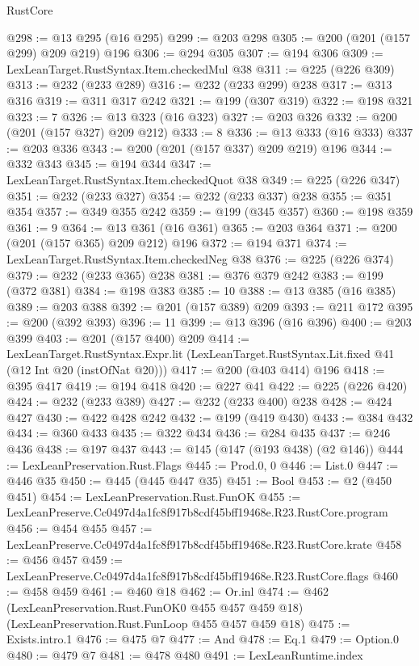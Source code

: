 \begin{lexlean}{RustCore}
\begin{coremodule}
@298 := @13 @295 (@16 @295)
@299 := @203 @298
@305 := @200 (@201 (@157 @299) @209 @219) @196
@306 := @294 @305
@307 := @194 @306
@309 := LexLeanTarget.RustSyntax.Item.checkedMul @38
@311 := @225 (@226 @309)
@313 := @232 (@233 @289)
@316 := @232 (@233 @299) @238
@317 := @313 @316
@319 := @311 @317 @242
@321 := @199 (@307 @319)
@322 := @198 @321
@323 := 7
@326 := @13 @323 (@16 @323)
@327 := @203 @326
@332 := @200 (@201 (@157 @327) @209 @212)
@333 := 8
@336 := @13 @333 (@16 @333)
@337 := @203 @336
@343 := @200 (@201 (@157 @337) @209 @219) @196
@344 := @332 @343
@345 := @194 @344
@347 := LexLeanTarget.RustSyntax.Item.checkedQuot @38
@349 := @225 (@226 @347)
@351 := @232 (@233 @327)
@354 := @232 (@233 @337) @238
@355 := @351 @354
@357 := @349 @355 @242
@359 := @199 (@345 @357)
@360 := @198 @359
@361 := 9
@364 := @13 @361 (@16 @361)
@365 := @203 @364
@371 := @200 (@201 (@157 @365) @209 @212) @196
@372 := @194 @371
@374 := LexLeanTarget.RustSyntax.Item.checkedNeg @38
@376 := @225 (@226 @374)
@379 := @232 (@233 @365) @238
@381 := @376 @379 @242
@383 := @199 (@372 @381)
@384 := @198 @383
@385 := 10
@388 := @13 @385 (@16 @385)
@389 := @203 @388
@392 := @201 (@157 @389) @209
@393 := @211 @172
@395 := @200 (@392 @393)
@396 := 11
@399 := @13 @396 (@16 @396)
@400 := @203 @399
@403 := @201 (@157 @400) @209
@414 := LexLeanTarget.RustSyntax.Expr.lit
    (LexLeanTarget.RustSyntax.Lit.fixed @41 (@12 Int @20 (instOfNat @20)))
@417 := @200 (@403 @414) @196
@418 := @395 @417
@419 := @194 @418
@420 := @227 @41
@422 := @225 (@226 @420)
@424 := @232 (@233 @389)
@427 := @232 (@233 @400) @238
@428 := @424 @427
@430 := @422 @428 @242
@432 := @199 (@419 @430)
@433 := @384 @432
@434 := @360 @433
@435 := @322 @434
@436 := @284 @435
@437 := @246 @436
@438 := @197 @437
@443 := @145 (@147 (@193 @438) (@2 @146))
@444 := LexLeanPreservation.Rust.Flags
@445 := Prod.{0, 0}
@446 := List.{0}
@447 := @446 @35
@450 := @445 (@445 @447 @35)
@451 := Bool
@453 := @2 (@450 @451)
@454 := LexLeanPreservation.Rust.FunOK
@455 := LexLeanPreserve.Cc0497d4a1fc8f917b8cdf45bff19468e.R23.RustCore.program
@456 := @454 @455
@457 := LexLeanPreserve.Cc0497d4a1fc8f917b8cdf45bff19468e.R23.RustCore.krate
@458 := @456 @457
@459 := LexLeanPreserve.Cc0497d4a1fc8f917b8cdf45bff19468e.R23.RustCore.flags
@460 := @458 @459
@461 := @460 @18
@462 := Or.inl
@474 := @462
    (LexLeanPreservation.Rust.FunOK0 @455 @457 @459 @18)
    (LexLeanPreservation.Rust.FunLoop @455 @457 @459 @18)
@475 := Exists.intro.{1}
@476 := @475 @7
@477 := And
@478 := Eq.{1}
@479 := Option.{0}
@480 := @479 @7
@481 := @478 @480
@491 := LexLeanRuntime.index

\end{coremodule}
\end{lexlean}
